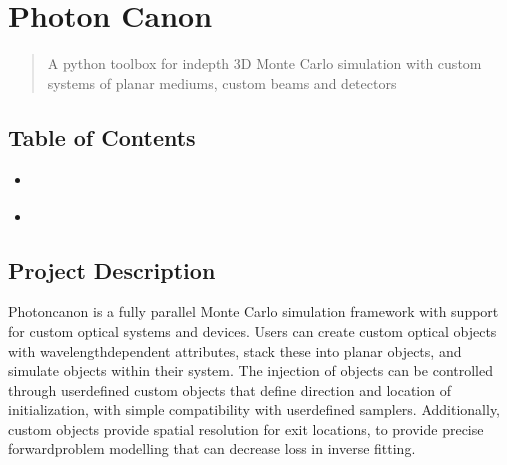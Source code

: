 \documentclass[letterpaper,10pt,english]{sphinxmanual}
\begin{document}
\sphinxstepscope


\chapter{Photon Canon}
\label{\detokenize{README:photon-canon}}\label{\detokenize{README::doc}}\begin{quote}

\sphinxAtStartPar
A python toolbox for in\sphinxhyphen{}depth 3D Monte Carlo simulation with custom systems of planar mediums, custom beams and
detectors
\end{quote}


\section{Table of Contents}
\label{\detokenize{README:table-of-contents}}\begin{itemize}
\item {} 
\sphinxAtStartPar
{\hyperref[\detokenize{README:project-description}]{}}

\item {} 
\sphinxAtStartPar
{\hyperref[\detokenize{README:installation}]{}}

\end{itemize}


\section{Project Description}
\label{\detokenize{README:project-description}}
\sphinxAtStartPar
Photon\sphinxhyphen{}canon is a fully parallel Monte Carlo simulation framework with support for custom optical systems and devices.
Users can create custom optical  objects with wavelength\sphinxhyphen{}dependent attributes, stack these into planar 
objects, and simulate  objects within their system. The injection of  objects can be controlled through
user\sphinxhyphen{}defined custom  objects that define direction and location of  initialization, with simple
compatibility with user\sphinxhyphen{}defined samplers. Additionally, custom  objects provide spatial resolution for
 exit locations, to provide precise forward\sphinxhyphen{}problem modelling that can decrease loss in inverse fitting.
\end{document}
